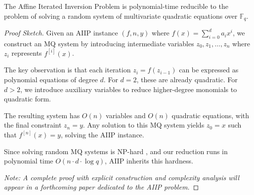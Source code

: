 \begin{theorem}\label{thm:aiip-mq}
    The Affine Iterated Inversion Problem is polynomial-time reducible to the problem of solving a random system of multivariate quadratic equations over $\mathbb{F}_q$.
\end{theorem}

\begin{proof}[Proof Sketch]
    Given an AIIP instance $(f, n, y)$ where $f(x) = \sum_{i=0}^d a_i x^i$, we construct an MQ system by introducing intermediate variables $z_0, z_1, \ldots, z_n$ where $z_i$ 
    represents $f^{[i]}(x)$.

    The key observation is that each iteration $z_i = f(z_{i-1})$ can be expressed as polynomial equations of degree $d$. For $d = 2$, these are already quadratic. For 
    $d > 2$, we introduce auxiliary variables to reduce higher-degree monomials to quadratic form.

    The resulting system has $O(n)$ variables and $O(n)$ quadratic equations, with the final constraint $z_n = y$. Any solution to this MQ system yields $z_0 = x$ such that 
    $f^{[n]}(x) = y$, solving the AIIP instance.

    Since solving random MQ systems is NP-hard \cite{Patarin1996}, and our reduction runs in polynomial time $O(n \cdot d \cdot \log q)$, AIIP inherits this hardness.

    \textit{Note: A complete proof with explicit construction and complexity analysis will appear in a forthcoming paper dedicated to the AIIP problem.}
\end{proof}

